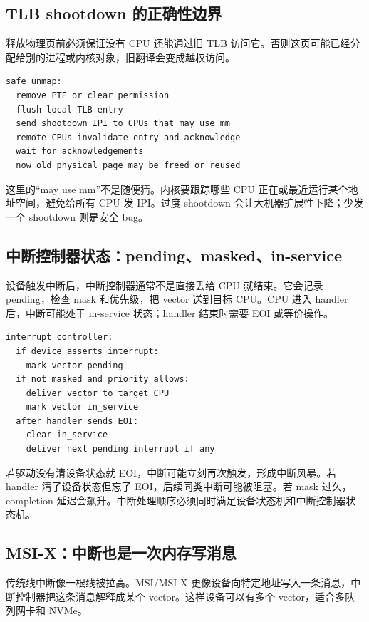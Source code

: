 \subsection{TLB shootdown 的正确性边界}

释放物理页前必须保证没有 CPU 还能通过旧 TLB 访问它。否则这页可能已经分配给别的进程或内核对象，旧翻译会变成越权访问。

\begin{lstlisting}
safe unmap:
  remove PTE or clear permission
  flush local TLB entry
  send shootdown IPI to CPUs that may use mm
  remote CPUs invalidate entry and acknowledge
  wait for acknowledgements
  now old physical page may be freed or reused
\end{lstlisting}

这里的“may use mm”不是随便猜。内核要跟踪哪些 CPU 正在或最近运行某个地址空间，避免给所有 CPU 发 IPI。过度 shootdown 会让大机器扩展性下降；少发一个 shootdown 则是安全 bug。

\subsection{中断控制器状态：pending、masked、in-service}

设备触发中断后，中断控制器通常不是直接丢给 CPU 就结束。它会记录 pending，检查 mask 和优先级，把 vector 送到目标 CPU。CPU 进入 handler 后，中断可能处于 in-service 状态；handler 结束时需要 EOI 或等价操作。

\begin{lstlisting}
interrupt controller:
  if device asserts interrupt:
    mark vector pending
  if not masked and priority allows:
    deliver vector to target CPU
    mark vector in_service
  after handler sends EOI:
    clear in_service
    deliver next pending interrupt if any
\end{lstlisting}

若驱动没有清设备状态就 EOI，中断可能立刻再次触发，形成中断风暴。若 handler 清了设备状态但忘了 EOI，后续同类中断可能被阻塞。若 mask 过久，completion 延迟会飙升。中断处理顺序必须同时满足设备状态机和中断控制器状态机。

\subsection{MSI-X：中断也是一次内存写消息}

传统线中断像一根线被拉高。MSI/MSI-X 更像设备向特定地址写入一条消息，中断控制器把这条消息解释成某个 vector。这样设备可以有多个 vector，适合多队列网卡和 NVMe。

